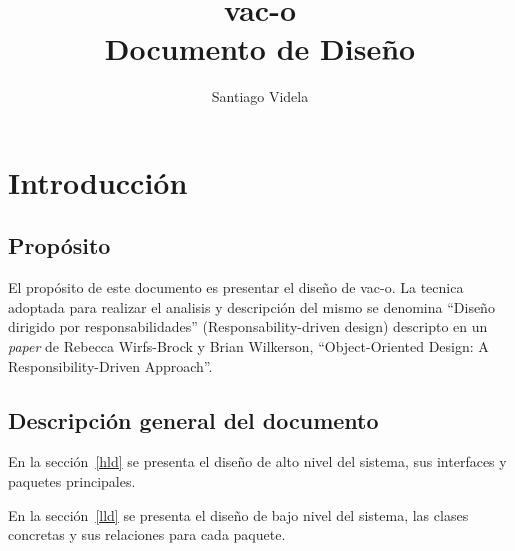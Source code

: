 \documentclass[a4paper,10pt]{article}
\author{Santiago Videla}
\title{vac-o\\ Documento de Dise\~no}
\begin{document}
\maketitle
\newpage
\tableofcontents
\newpage
\section{Introducci\'on}
  \subsection{Prop\'osito}
  El prop\'osito de este documento es presentar el dise\~no de vac-o. La
tecnica adoptada para realizar el analisis y descripci\'on del mismo se
denomina ``Dise\~no dirigido por responsabilidades'' (Responsability-driven
design) descripto en un \textit{paper} de Rebecca Wirfs-Brock y Brian
Wilkerson, ``Object-Oriented Design: A Responsibility-Driven Approach''.

  \subsection{Descripci\'on general del documento}
  En la secci\'on~\ref{hld} se presenta el dise\~no de alto nivel del sistema,
sus interfaces y paquetes principales.

  En la secci\'on~\ref{lld} se presenta el dise\~no de bajo nivel del sistema,
las clases concretas y sus relaciones para cada paquete.

  
  
\end{document}
